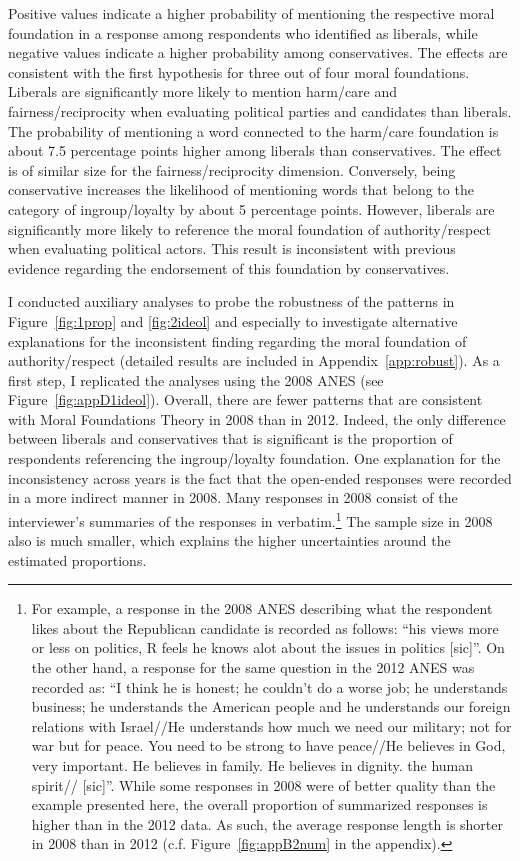 \documentclass[12pt]{article}
\begin{document}
Positive values indicate a higher probability of mentioning the respective moral foundation in a response among respondents who identified as liberals, while negative values indicate a higher probability among conservatives. The effects are consistent with the first hypothesis for three out of four moral foundations. Liberals are significantly more likely to mention harm/care and fairness/reciprocity when evaluating political parties and candidates than liberals. The probability of mentioning a word connected to the harm/care foundation is about 7.5 percentage points higher among liberals than conservatives. The effect is of similar size for the fairness/reciprocity dimension. Conversely, being conservative increases the likelihood of mentioning words that belong to the category of ingroup/loyalty by about 5 percentage points. However, liberals are significantly more likely to reference the moral foundation of authority/respect when evaluating political actors. This result is inconsistent with previous evidence regarding the endorsement of this foundation by conservatives. 

I conducted auxiliary analyses to probe the robustness of the patterns in Figure~\ref{fig:1prop} and \ref{fig:2ideol} and especially to investigate alternative explanations for the inconsistent finding regarding the moral foundation of authority/respect (detailed results are included in Appendix~\ref{app:robust}). As a first step, I replicated the analyses using the 2008 ANES (see Figure~\ref{fig:appD1ideol}). Overall, there are fewer patterns that are consistent with Moral Foundations Theory in 2008 than in 2012. Indeed, the only difference between liberals and conservatives that is significant is the proportion of respondents referencing the ingroup/loyalty foundation. One explanation for the inconsistency across years is the fact that the open-ended responses were recorded in a more indirect manner in 2008. Many responses in 2008 consist of the interviewer's summaries of the responses in verbatim.\footnote{For example, a response in the 2008 ANES describing what the respondent likes about the Republican candidate is recorded as follows: ``his views more or less on politics, R feels he knows alot about the issues in politics
[sic]''. On the other hand, a response for the same question in the 2012 ANES was recorded as: ``I think he is honest; he couldn't do a worse job; he understands business; he understands the American people and he understands our foreign relations with Israel//He understands how much we need our military; not for war but for peace. You need to be strong to have peace//He believes in God, very important. He believes in family. He believes in dignity. the human spirit// [sic]''. While some responses in 2008 were of better quality than the example presented here, the overall proportion of summarized responses is higher than in the 2012 data. As such, the average response length is shorter in 2008 than in 2012 (c.f. Figure~\ref{fig:appB2num} in the appendix).} The sample size in 2008 also is much smaller, which explains the higher uncertainties around the estimated proportions.
\end{document}
